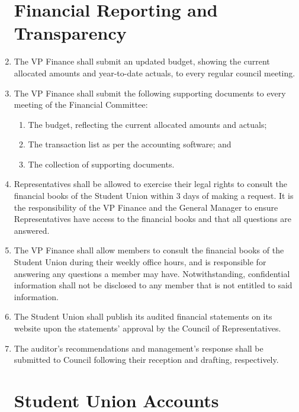 \documentclass[oneside]{book}
\begin{document}
\begin{enumerate}
\chapter{\label{Financial_Reporting_and_Transparency}Financial Reporting and Transparency}

\item The VP Finance shall submit an updated budget, showing the current allocated amounts and year-to-date actuals, to every regular council meeting.
\item The VP Finance shall submit the following supporting documents to every meeting of the Financial Committee:
\begin{enumerate}
\item The budget, reflecting the current allocated amounts and actuals;
\item The transaction list as per the accounting software; and
\item The collection of supporting documents.
\end{enumerate}
\item Representatives shall be allowed to exercise their legal rights to
consult the financial books of the Student Union within 3 days of
making a request. It is the responsibility of the VP Finance
and the General Manager to ensure Representatives have access to the financial
books and that all questions are answered.
\item The VP Finance shall allow members to consult the financial books of the Student Union during their weekly office hours, and is responsible for answering any questions a member may have. Notwithstanding, confidential information shall not be disclosed to any member that is not entitled to said information.
\item The Student Union shall publish its audited financial statements on its website upon the statements’ approval by the Council of Representatives.
\item The auditor’s recommendations and management’s response shall be submitted to Council following their reception and drafting, respectively. 

\chapter{\label{Student_Union_Accounts}Student Union Accounts}


\end{enumerate}
\end{document}
